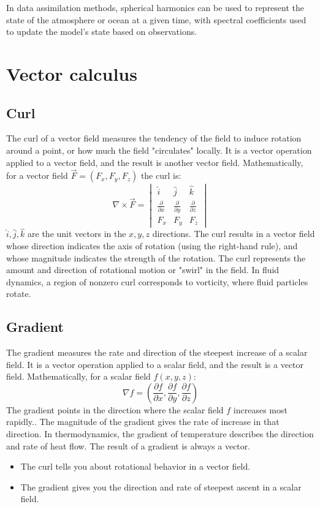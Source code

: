 In data assimilation methods, spherical harmonics can be used to represent the state of the atmosphere or ocean at a given time, with spectral coefficients used to update the model's state based on observations.

\section{Vector calculus}
\subsection{Curl}
The curl of a vector field measures the tendency of the field to induce rotation around a point, or how much the field "circulates" locally. It is a vector operation applied to a vector field, and the result is another vector field. Mathematically, for a vector field $\vec{F}=(F_x, F_y, F_z)$ the curl is:
$$\nabla\times \vec{F}=\begin{vmatrix}
		\hat{i}                     & \hat{j}                     & \hat{k}                     \\
		\frac{\partial}{\partial x} & \frac{\partial}{\partial y} & \frac{\partial}{\partial z} \\
		F_x                         & F_y                         & F_z
	\end{vmatrix}$$
$\hat{i}, \hat{j}, \hat{k}$ are the unit vectors in the $x,y,z$ directions.
The curl results in a vector field whose direction indicates the axis of rotation (using the right-hand rule), and whose magnitude indicates the strength of the rotation.  The curl represents the amount and direction of rotational motion or "swirl" in the field. In fluid dynamics, a region of nonzero curl corresponds to vorticity, where fluid particles rotate.
\subsection{Gradient}
The gradient measures the rate and direction of the steepest increase of a scalar field. It is a vector operation applied to a scalar field, and the result is a vector field. Mathematically, for a scalar field $f(x,y,z)$:
$$\nabla f=\left(\frac{\partial f}{\partial x}, \frac{\partial f}{\partial y}, \frac{\partial f}{\partial z}\right)$$
The gradient points in the direction where the scalar field $f$ increases most rapidly.. The magnitude of the gradient gives the rate of increase in that direction. In thermodynamics, the gradient of temperature describes the direction and rate of heat flow. The result of a gradient is always a vector.
\begin{itemize}
	\item The curl tells you about rotational behavior in a vector field.
	\item The gradient gives you the direction and rate of steepest ascent in a scalar field.
\end{itemize}
